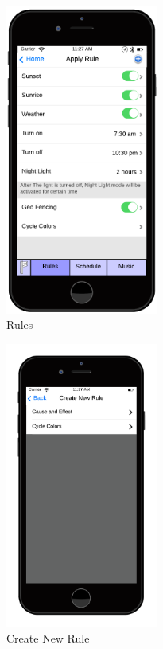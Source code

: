 \documentclass[12pt]{article}
\begin{document}
  
  \begin{figure}[ht!]
    \centering
    \includegraphics[width=50mm]{ApplyRule.png}
    \caption{Rules}
    \label{fig:rules}
  \end{figure}
  
  \begin{figure}[ht!]
    \centering
    \includegraphics[width=50mm]{Create_Rule.png}
    \caption{Create New Rule}
    \label{fig:newRule}
  \end{figure}
  
\end{document}
